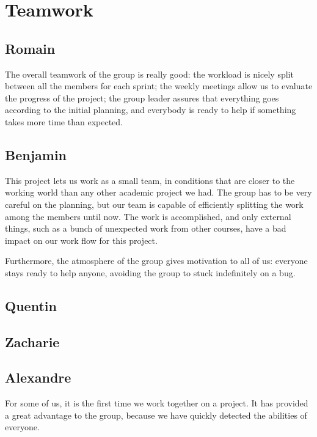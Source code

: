\section{Teamwork}

\subsection{Romain}
The overall teamwork of the group is really good: the workload is nicely
split between all the members for each sprint; the weekly meetings allow
us to evaluate the progress of the project; the group leader assures that
everything goes according to the initial planning, and everybody is ready to
help if something takes more time than expected. \newline

\subsection{Benjamin}

This project lets us work as a small team, in conditions that are closer to the working world than any other academic project we had. The group has to be very careful on the planning, but our team is capable of efficiently splitting the work among the members until now. The work is accomplished, and only external things, such as a bunch of unexpected work from other courses, have a bad impact on our work flow for this project. \newline

Furthermore, the atmosphere of the group gives motivation to all of us: everyone stays ready to help anyone, avoiding the group to stuck indefinitely on a bug.

\subsection{Quentin}
\subsection{Zacharie}
\subsection{Alexandre}

For some of us, it is the first time we work together on a project. It has provided a great advantage to the group, because we have quickly detected the abilities of everyone. \newline

